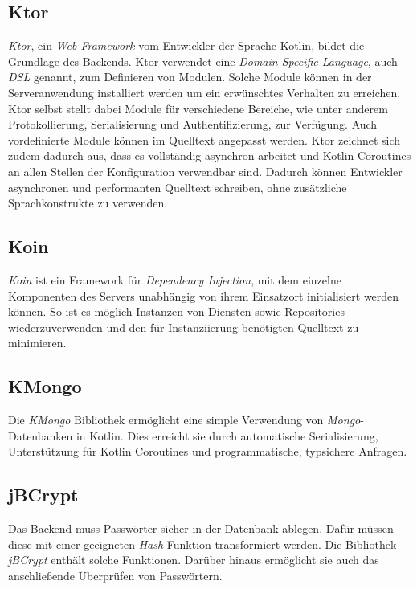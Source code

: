 \subsection{Ktor}
\label{subsec:backend:bibs:ktor}
\textit{Ktor}, ein \textit{Web Framework} vom Entwickler der Sprache Kotlin, bildet die Grundlage des Backends.
Ktor verwendet eine \textit{Domain Specific Language}, auch \textit{DSL} genannt, zum Definieren von Modulen.
Solche Module können in der Serveranwendung installiert werden um ein erwünschtes Verhalten zu erreichen.
Ktor selbst stellt dabei Module für verschiedene Bereiche, wie unter anderem Protokollierung, Serialisierung und Authentifizierung, zur Verfügung.
Auch vordefinierte Module können im Quelltext angepasst werden.
Ktor zeichnet sich zudem dadurch aus, dass es vollständig asynchron arbeitet und Kotlin Coroutines an allen Stellen der Konfiguration verwendbar sind.
Dadurch können Entwickler asynchronen und performanten Quelltext schreiben, ohne zusätzliche Sprachkonstrukte zu verwenden.

\subsection{Koin}
\label{subsec:backend:bibs:koin}
\textit{Koin} ist ein Framework für \textit{Dependency Injection}, mit dem einzelne Komponenten des Servers unabhängig von ihrem Einsatzort initialisiert werden können.
So ist es möglich Instanzen von Diensten sowie Repositories wiederzuverwenden und den für Instanziierung benötigten Quelltext zu minimieren.

\subsection{KMongo}
\label{subsec:backend:bibs:kmongo}
Die \textit{KMongo} Bibliothek ermöglicht eine simple Verwendung von \textit{Mongo}-Datenbanken in Kotlin.
Dies erreicht sie durch automatische Serialisierung, Unterstützung für Kotlin Coroutines und programmatische, typsichere Anfragen.

\subsection{jBCrypt}
\label{subsec:backend:bibs:jbcrypt}
Das Backend muss Passwörter sicher in der Datenbank ablegen.
Dafür müssen diese mit einer geeigneten \textit{Hash}-Funktion transformiert werden.
Die Bibliothek \textit{jBCrypt} enthält solche Funktionen.
Darüber hinaus ermöglicht sie auch das anschließende Überprüfen von Passwörtern.

